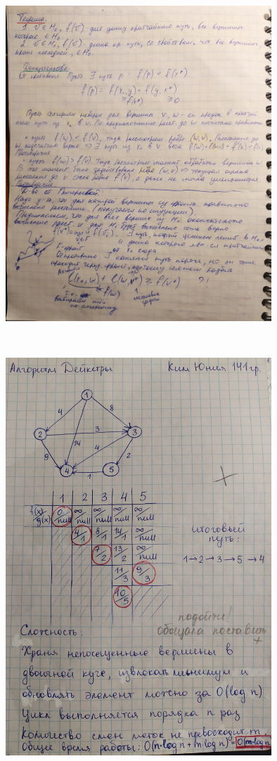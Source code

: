 \documentclass[discrete.tex]{subfiles}
\begin{document}
  \begin{figure}[H]
          \includegraphics[width=10cm]{pics/45_2}
          \centering
  \end{figure}

  \begin{Example} \
    \begin{figure}[H]
            \includegraphics[width=10cm]{pics/45_3}
            \centering
    \end{figure}
  \end{Example}
\end{document}
